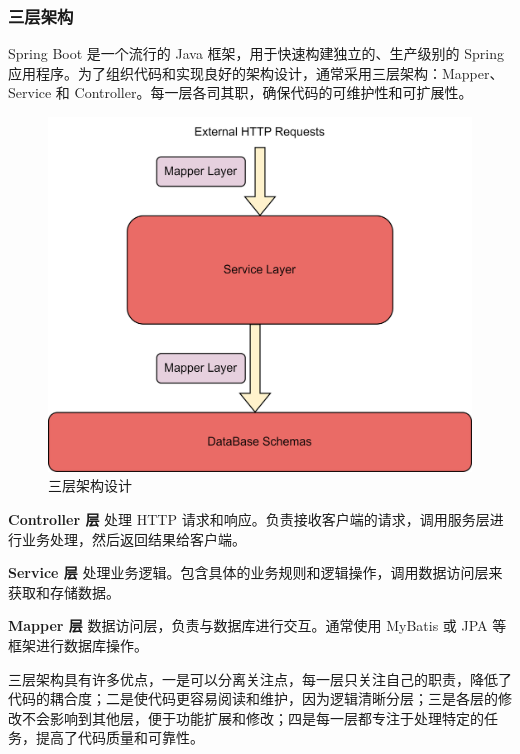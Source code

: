 \documentclass{base}
\begin{document}
\subsubsection{三层架构}

Spring Boot 是一个流行的 Java 框架，用于快速构建独立的、生产级别的 Spring 应用程序。为了组织代码和实现良好的架构设计，通常采用三层架构：Mapper、Service 和 Controller。每一层各司其职，确保代码的可维护性和可扩展性。

\begin{figure}[H]
	\centering
	\includegraphics[width=0.7\linewidth]{images/ThreeLayersDesign}
	\caption{三层架构设计}
	\label{fig:threelayersdesign}
\end{figure}

\textbf{Controller 层} 处理 HTTP 请求和响应。负责接收客户端的请求，调用服务层进行业务处理，然后返回结果给客户端。

\textbf{Service 层} 处理业务逻辑。包含具体的业务规则和逻辑操作，调用数据访问层来获取和存储数据。

\textbf{Mapper 层} 数据访问层，负责与数据库进行交互。通常使用 MyBatis 或 JPA 等框架进行数据库操作。

三层架构具有许多优点，一是可以分离关注点，每一层只关注自己的职责，降低了代码的耦合度；二是使代码更容易阅读和维护，因为逻辑清晰分层；三是各层的修改不会影响到其他层，便于功能扩展和修改；四是每一层都专注于处理特定的任务，提高了代码质量和可靠性。
\end{document}
